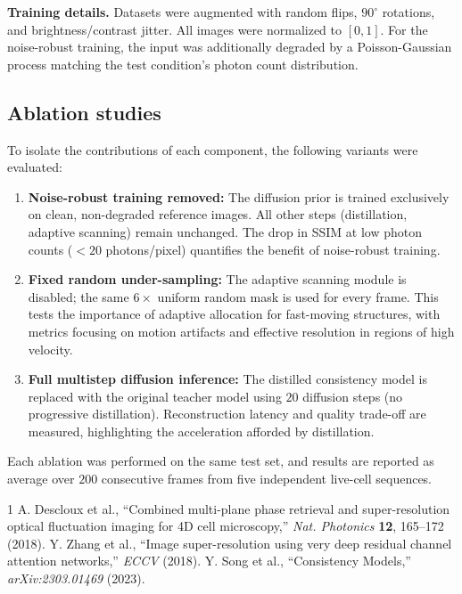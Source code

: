 \documentclass{article}
\begin{document}
\textbf{Training details.} Datasets were augmented with random flips, $90^\circ$ rotations, and brightness/contrast jitter. All images were normalized to $[0,1]$. For the noise-robust training, the input was additionally degraded by a Poisson-Gaussian process matching the test condition’s photon count distribution.

\subsection{Ablation studies}
\label{subsec:ablations}
To isolate the contributions of each component, the following variants were evaluated:
\begin{enumerate}
    \item \textbf{Noise-robust training removed:} The diffusion prior is trained exclusively on clean, non-degraded reference images. All other steps (distillation, adaptive scanning) remain unchanged. The drop in SSIM at low photon counts ($<20$ photons/pixel) quantifies the benefit of noise-robust training.
    \item \textbf{Fixed random under-sampling:} The adaptive scanning module is disabled; the same $6\times$ uniform random mask is used for every frame. This tests the importance of adaptive allocation for fast-moving structures, with metrics focusing on motion artifacts and effective resolution in regions of high velocity.
    \item \textbf{Full multistep diffusion inference:} The distilled consistency model is replaced with the original teacher model using $20$ diffusion steps (no progressive distillation). Reconstruction latency and quality trade-off are measured, highlighting the acceleration afforded by distillation.
\end{enumerate}
Each ablation was performed on the same test set, and results are reported as average over $200$ consecutive frames from five independent live-cell sequences.

\begin{thebibliography}{1}
 A. Descloux et al., ``Combined multi-plane phase retrieval and super-resolution optical fluctuation imaging for 4D cell microscopy,'' \textit{Nat. Photonics} \textbf{12}, 165–172 (2018).
 Y. Zhang et al., ``Image super-resolution using very deep residual channel attention networks,'' \textit{ECCV} (2018).
 Y. Song et al., ``Consistency Models,'' \textit{arXiv:2303.01469} (2023).
\end{thebibliography}
\end{document}

